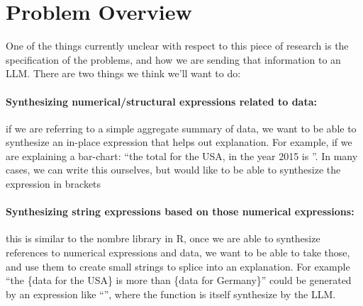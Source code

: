 \section{Problem Overview}
One of the things currently unclear with respect to this piece of research is the
specification of the problems, and how we are sending that information to an LLM.
There are two things we think we'll want to do:
\paragraph*{Synthesizing numerical/structural expressions related to data:}
if we are referring to a simple aggregate summary of data, we want to be able
to synthesize an in-place expression that helps out explanation. For example,
if we are explaining a bar-chart: ``the total for the USA, in the year 2015 is
''. In many cases, we can write this ourselves,
but would like to be able to synthesize the expression in brackets
\paragraph*{Synthesizing string expressions based on those numerical expressions:}
this is similar to the nombre library in R, once we are able to synthesize references
to numerical expressions and data, we want to be able to take those, and use them to
create small strings to splice into an explanation. For example ``the \{data for the USA\} is more than \{data for Germany\}''
could be generated by an expression like ``'',
where the function  is itself synthesize by the LLM.
